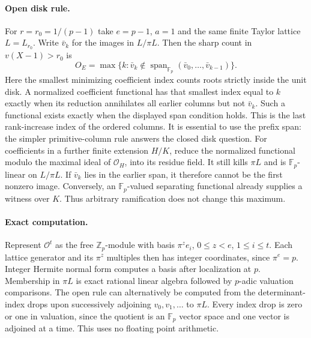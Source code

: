 \paragraph{Open disk rule.}
For $r=r_0=1/(p-1)$ take $e=p-1$, $a=1$ and the same finite Taylor lattice
$L=L_{r_0}$. Write $\bar v_k$ for the images in $L/\pi L$. Then the sharp
count in $v(X-1)>r_0$ is
\[
 O_E=\max\{k:\bar v_k\notin
   \operatorname{span}_{\mathbb F_p}(\bar v_0,\ldots,\bar v_{k-1})\}.
\]
Here the smallest minimizing coefficient index counts roots strictly
inside the unit disk. A normalized coefficient functional has that
smallest index equal to $k$ exactly when its reduction annihilates all
earlier columns but not $\bar v_k$. Such a functional exists exactly
when the displayed span condition holds. This is the last rank-increase
index of the ordered columns. It is essential to use the prefix span:
the simpler primitive-column rule answers the closed disk question.
For coefficients in a further finite extension $H/K$, reduce the normalized
functional modulo the maximal ideal of $\mathcal O_H$, into its residue
field. It still kills $\pi L$
and is $\mathbb F_p$-linear on $L/\pi L$. If $\bar v_k$ lies in the
earlier span, it therefore cannot be the first nonzero image. Conversely,
an $\mathbb F_p$-valued separating functional already supplies a witness
over $K$. Thus arbitrary ramification does not change this maximum.

\paragraph{Exact computation.}
Represent $\mathcal O^t$ as the free $\mathbb Z_p$-module with basis
$\pi^z e_i$, $0\le z<e$, $1\le i\le t$. Each lattice generator and its
$\pi^z$ multiples then has integer coordinates, since $\pi^e=p$.
Integer Hermite normal form computes a basis after localization at $p$.
Membership in $\pi L$ is exact rational linear algebra followed by
$p$-adic valuation comparisons. The open rule can alternatively be
computed from the determinant-index drops upon successively adjoining
$v_0,v_1,\ldots$ to $\pi L$. Every index drop is zero or one in valuation,
since the quotient is an $\mathbb F_p$ vector space and one vector is
adjoined at a time. This uses no floating point arithmetic.

